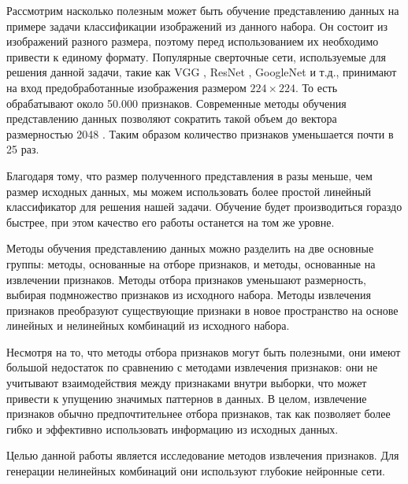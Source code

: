 Рассмотрим насколько полезным может быть обучение представлению данных на примере задачи классификации изображений из данного набора. Он состоит из изображений разного размера, поэтому перед использованием их необходимо привести к единому формату. Популярные сверточные сети, используемые для решения данной задачи, такие как VGG \cite{VGG}, ResNet \cite{ResNet}, GoogleNet \cite{GoogleNet} и т.д., принимают на вход предобработанные изображения размером $224\times224$. То есть обрабатывают около 50.000 признаков. Современные методы обучения представлению данных позволяют сократить такой объем до вектора размерностью 2048 \cite{Vicreg}. Таким образом количество признаков уменьшается почти в 25 раз. 

Благодаря тому, что размер полученного представления в разы меньше, чем размер исходных данных, мы можем использовать более простой линейный классификатор для решения нашей задачи. Обучение будет производиться  гораздо быстрее, при этом качество его работы останется на том же уровне.

Методы обучения представлению данных можно разделить на две основные группы: методы, основанные на отборе признаков, и методы, основанные на извлечении признаков. Методы отбора признаков уменьшают размерность, выбирая подмножество признаков из исходного набора. Методы извлечения признаков преобразуют существующие признаки в новое пространство на основе линейных и нелинейных комбинаций из исходного набора.

Несмотря на то, что методы отбора признаков могут быть полезными, они имеют большой недостаток по сравнению с методами извлечения признаков: они не учитывают взаимодействия между признаками внутри выборки, что может привести к упущению значимых паттернов в данных. В целом, извлечение признаков обычно предпочтительнее отбора признаков, так как позволяет более гибко и эффективно использовать информацию из исходных данных.

Целью данной работы является исследование методов извлечения признаков. Для генерации нелинейных комбинаций они используют глубокие нейронные сети.


